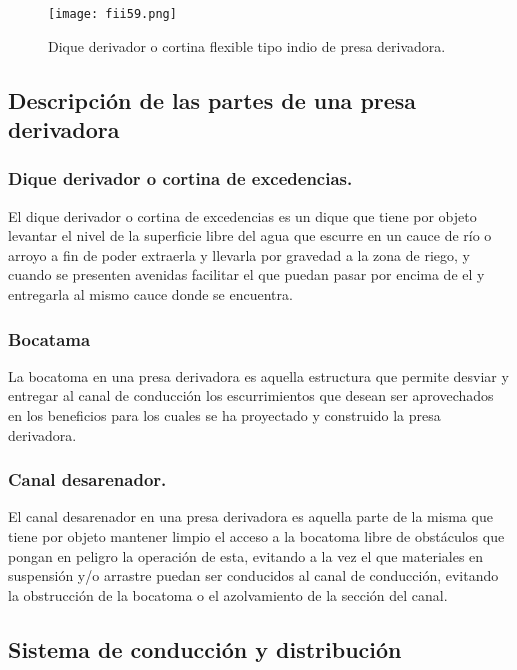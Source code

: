 \begin{figure}[h!]
	\centerline{\texttt{[image: fii59.png]}}
	\caption{Dique derivador o cortina flexible tipo indio de presa derivadora.}
	\label{fii59}
\end{figure}

\subsection{Descripción de las partes de una presa derivadora}

\subsubsection{Dique derivador o cortina de excedencias.}

El dique derivador o cortina de excedencias es un dique que tiene por objeto
levantar el nivel de la superficie libre del agua que escurre en un cauce de río o arroyo a
fin de poder extraerla y llevarla por gravedad a la zona de riego, y cuando se presenten
avenidas facilitar el que puedan pasar por encima de el y entregarla al mismo cauce
donde se encuentra.

\subsubsection{Bocatama}

La bocatoma en una presa derivadora es aquella estructura que permite desviar
y entregar al canal de conducción los escurrimientos que desean ser aprovechados en
los beneficios para los cuales se ha proyectado y construido la presa derivadora.

\subsubsection{Canal desarenador.}

El canal desarenador en una presa derivadora es aquella parte de la misma que
tiene por objeto mantener limpio el acceso a la bocatoma libre de obstáculos que
pongan en peligro la operación de esta, evitando a la vez el que materiales en
suspensión y/o arrastre puedan ser conducidos al canal de conducción, evitando la
obstrucción de la bocatoma o el azolvamiento de la sección del canal.

\subsection{Sistema de conducción y distribución}

